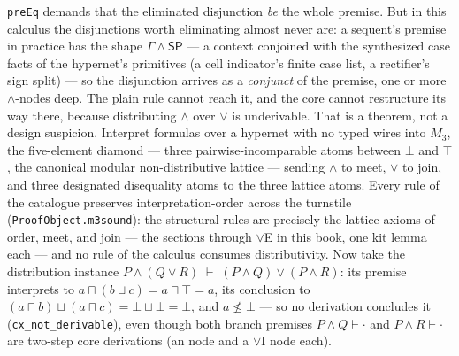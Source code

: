\begin{bremark}
\label{rem:ore-reach}
\texttt{preEq} demands that the eliminated disjunction \emph{be} the
whole premise. But in this calculus the disjunctions worth eliminating
almost never are: a sequent's premise in practice has the shape
$\Gamma \wedge \mathsf{SP}$ --- a context conjoined with the synthesized
case facts of the hypernet's primitives (a cell indicator's finite case
list, a rectifier's sign split) --- so the disjunction arrives as a
\emph{conjunct} of the premise, one or more $\wedge$-nodes deep. The
plain rule cannot reach it, and the core cannot restructure its way
there, because distributing $\wedge$ over $\vee$ is underivable. That is
a theorem, not a design suspicion. Interpret formulas over a hypernet
with no typed wires into $M_3$, the five-element diamond --- three
pairwise-incomparable atoms between $\bot$ and $\top$, the canonical
modular non-distributive lattice \cite{birkhoff1967} --- sending
$\wedge$ to meet, $\vee$ to join, and three designated disequality atoms
to the three lattice atoms. Every rule of the catalogue preserves
interpretation-order across the turnstile
(\texttt{ProofObject.m3sound}): the structural rules are precisely the
lattice axioms of order, meet, and join --- the sections
 through $\vee$E in this book, one kit lemma each --- and
no rule of the calculus consumes distributivity. Now take the
distribution instance
$P \wedge (Q \vee R) \;\vdash\; (P \wedge Q) \vee (P \wedge R)$:
its premise interprets to $a \sqcap (b \sqcup c) = a \sqcap \top = a$,
its conclusion to $(a \sqcap b) \sqcup (a \sqcap c) = \bot \sqcup \bot
= \bot$, and $a \not\leq \bot$ --- so no derivation concludes it
(\texttt{cx\_not\_derivable}), even though both branch premises
$P \wedge Q \vdash \cdot$ and $P \wedge R \vdash \cdot$ are two-step
core derivations (an  node and a $\vee$I node each).
\end{bremark}

